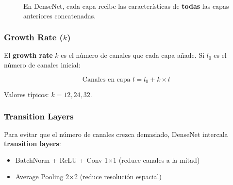 \documentclass[12pt,a4paper]{article}
\begin{document}
\begin{figure}[H]
\centering
{}
\caption{En DenseNet, cada capa recibe las características de \textbf{todas} las capas anteriores concatenadas.}
\end{figure}

\subsubsection{Growth Rate ($k$)}

El \textbf{growth rate} $k$ es el número de canales que cada capa añade. Si $l_0$ es el número de canales inicial:

\begin{equation}
\text{Canales en capa } l = l_0 + k \times l
\end{equation}

Valores típicos: $k = 12, 24, 32$.

\subsubsection{Transition Layers}

Para evitar que el número de canales crezca demasiado, DenseNet intercala \textbf{transition layers}:

\begin{itemize}
    \item BatchNorm + ReLU + Conv 1×1 (reduce canales a la mitad)
    \item Average Pooling 2×2 (reduce resolución espacial)
\end{itemize}
\end{document}
